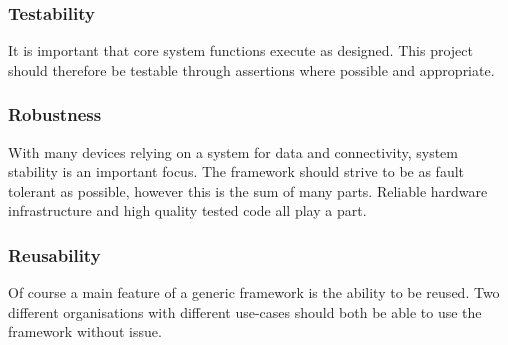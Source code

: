       \subsubsection{Testability}
        It is important that core system functions execute as designed. This project should therefore be testable through assertions where possible and appropriate.

      \subsubsection{Robustness}
        With many devices relying on a system for data and connectivity, system stability is an important focus. The framework should strive to be as fault tolerant as possible, however this is the sum of many parts. Reliable hardware infrastructure and high quality tested code all play a part.

      \subsubsection{Reusability}
        Of course a main feature of a generic framework is the ability to be reused. Two different organisations with different use-cases should both be able to use the framework without issue.